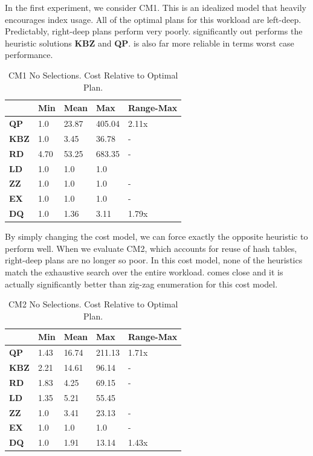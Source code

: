 In the first experiment, we consider CM1. This is an idealized model that heavily encourages index usage. All of the optimal plans for this workload are left-deep. Predictably, right-deep plans perform very poorly. \sys significantly out performs the heuristic solutions \textbf{KBZ} and \textbf{QP}. \sys is also far more reliable in terms worst case performance. 

\begin{table}[ht!]\centering \small
\caption{CM1 No Selections. Cost Relative to Optimal Plan. }\vspace{0.25em}
\begin{tabular}{|l|l|l|l|l|}
\hline
    & {\bf Min}  & {\bf Mean}  & {\bf Max}    & {\bf Range-Max} \\ \hline
{\bf QP}  & 1.0  & 23.87 & 405.04 & 2.11x      \\ \hline
{\bf KBZ} & 1.0  & 3.45  & 36.78  & -         \\ \hline
{\bf RD}  & 4.70 & 53.25 & 683.35 & -         \\ \hline
{\bf LD}  & 1.0  & 1.0   & 1.0    &           \\ \hline
{\bf ZZ}  & 1.0  & 1.0   & 1.0    & -         \\ \hline
{\bf EX}  & 1.0  & 1.0   & 1.0    & -         \\ \hline
\hline
{\bf DQ}  & 1.0  & 1.36   & 3.11    & 1.79x\\ \hline
\end{tabular}
\end{table}

By simply changing the cost model, we can force exactly the opposite heuristic to perform well. When we evaluate CM2, which accounts for reuse of hash tables, right-deep plans are no longer so poor. In this cost model, none of the heuristics match the exhaustive search over the entire workload. \sys comes close and it is actually significantly better than zig-zag enumeration for this cost model.

\begin{table}[ht!]\centering \small
\caption{CM2 No Selections. Cost Relative to Optimal Plan. }\vspace{0.25em}
\begin{tabular}{|l|l|l|l|l|}
\hline
    & {\bf Min}  & {\bf Mean}  & {\bf Max}    & {\bf Range-Max} \\ \hline
{\bf QP}  & 1.43  & 16.74 & 211.13 & 1.71x      \\ \hline
{\bf KBZ} & 2.21  & 14.61  & 96.14  & -         \\ \hline
{\bf RD}  & 1.83 & 4.25 & 69.15 & -         \\ \hline
{\bf LD}  & 1.35  & 5.21   & 55.45    &           \\ \hline
{\bf ZZ}  & 1.0  & 3.41   & 23.13    & -         \\ \hline
{\bf EX}  & 1.0  & 1.0   & 1.0    & -         \\ \hline
\hline
{\bf DQ}  & 1.0  & 1.91   & 13.14    & 1.43x\\ \hline
\end{tabular}
\end{table}

